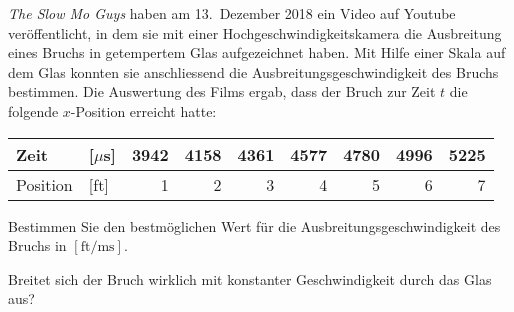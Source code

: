 {\em The Slow Mo Guys} haben am 13.~Dezember 2018 ein Video auf Youtube
veröffentlicht, in dem sie mit einer Hochgeschwindigkeitskamera die
Ausbreitung eines Bruchs in getempertem Glas aufgezeichnet haben.
Mit Hilfe einer Skala auf dem Glas konnten sie anschliessend die 
Ausbreitungsgeschwindigkeit des Bruchs bestimmen.
Die Auswertung des Films ergab, dass der Bruch zur Zeit $t$ die folgende
$x$-Position erreicht hatte:
\begin{center}
\begin{tabular}{ll|rrrrrrr}
Zeit    &[$\mu$s]&3942&4158&4361&4577&4780&4996&5225\\
\hline
Position&[ft]    &1      &2      &3      &4     &5     &6     &7
\end{tabular}
\end{center}
\begin{teilaufgaben}
\item
Bestimmen Sie den bestmöglichen Wert für die Ausbreitungsgeschwindigkeit
des Bruchs in $[\text{ft}/\text{ms}]$.
\item
Breitet sich der Bruch wirklich mit konstanter Geschwindigkeit durch das
Glas aus?
\end{teilaufgaben}


